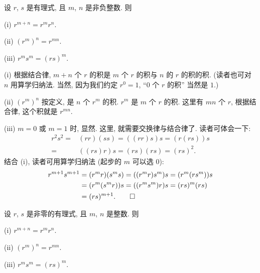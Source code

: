 \begin{proposition}
    设 $r$, $s$ 是有理式, 且 $m$, $n$ 是非负整数. 则

    (i) $r^{m+n} = r^m r^n$.

    (ii) $(r^m)^n = r^{mn}$.

    (iii) $r^m s^m = (rs)^m$.
\end{proposition}

\begin{pf}
    (i) 根据结合律, $m + n$ 个 $r$ 的积是 $m$ 个 $r$ 的积与 $n$ 的 $r$ 的积的积. (读者也可对 $n$ 用算学归纳法. 当然, 因为我们约定 $r^0 = 1$, ``$0$ 个 $r$ 的积'' 当然是 $1$.)

    (ii) $(r^m)^n$ 按定义, 是 $n$ 个 $r^m$ 的积. $r^m$ 是 $m$ 个 $r$ 的积. 这里有 $mn$ 个 $r$, 根据结合律, 这个积就是 $r^{mn}$.

    (iii) $m = 0$ 或 $m = 1$ 时, 显然. 这里, 就需要交换律与结合律了. 读者可体会一下:
    \begin{align*}
        r^2 s^2
        = {} & (rr) (ss) = ((rr)s) s = (r(rs)) s \\
        = {} & ((rs) r) s = (rs) (rs) = (rs)^2.
    \end{align*}
    结合 (i), 读者可用算学归纳法 (起步的 $m$ 可以选 $0$):
    \begin{align*}
        r^{m+1} s^{m+1}
        = {} & (r^m r) (s^m s) = ((r^m r) s^m) s = (r^m (r s^m)) s \\
        = {} & (r^m (s^m r)) s = ((r^m s^m) r) s = (rs)^m (rs)     \\
        = {} & (rs)^{m+1}. \qedhere
    \end{align*}
\end{pf}

\begin{proposition}
    设 $r$, $s$ 是非零的有理式, 且 $m$, $n$ 是整数. 则

    (i) $r^{m+n} = r^m r^n$.

    (ii) $(r^m)^n = r^{mn}$.

    (iii) $r^m s^m = (rs)^m$.
\end{proposition}

